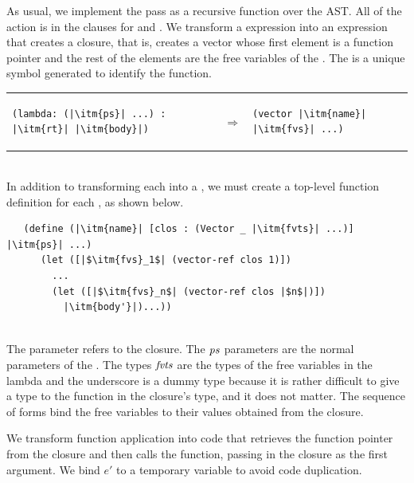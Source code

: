 \documentclass[11pt]{book}
\begin{document}
As usual, we implement the pass as a recursive function over the
AST. All of the action is in the clauses for  and
. We transform a  expression into an expression
that creates a closure, that is, creates a vector whose first element
is a function pointer and the rest of the elements are the free
variables of the .  The  is a unique symbol
generated to identify the function.

\begin{tabular}{lll}
\begin{minipage}{0.4\textwidth}
\begin{lstlisting}
(lambda: (|\itm{ps}| ...) : |\itm{rt}| |\itm{body}|)
\end{lstlisting}
\end{minipage}
&
$\Rightarrow$
&
\begin{minipage}{0.4\textwidth}
\begin{lstlisting}
(vector |\itm{name}| |\itm{fvs}| ...)
\end{lstlisting}
\end{minipage}
\end{tabular}  \\
%
In addition to transforming each  into a , we
must create a top-level function definition for each , as
shown below.\\
\begin{minipage}{0.8\textwidth}
  \begin{lstlisting}
   (define (|\itm{name}| [clos : (Vector _ |\itm{fvts}| ...)] |\itm{ps}| ...)
      (let ([|$\itm{fvs}_1$| (vector-ref clos 1)])
        ...
        (let ([|$\itm{fvs}_n$| (vector-ref clos |$n$|)])
          |\itm{body'}|)...))
\end{lstlisting}
\end{minipage}\\
The  parameter refers to the closure. The $\mathit{ps}$
parameters are the normal parameters of the . The types
$\mathit{fvts}$ are the types of the free variables in the lambda and the
underscore is a dummy type because it is rather difficult to give a
type to the function in the closure's type, and it does not matter.
The sequence of  forms bind the free variables to their
values obtained from the closure.

We transform function application into code that retrieves the
function pointer from the closure and then calls the function, passing
in the closure as the first argument. We bind $e'$ to a temporary
variable to avoid code duplication.
\end{document}
